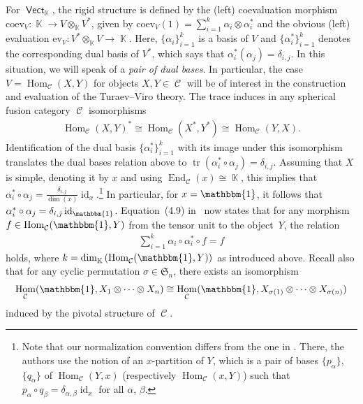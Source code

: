 \documentclass[10pt,a4paper]{amsart}
\DeclareMathOperator{\id}{id}
\DeclareMathOperator{\End}{End}
\DeclareMathOperator{\Hom}{Hom}
\DeclareMathOperator{\tr}{tr}
\DeclareMathOperator{\vect}{\mathsf{Vect}}
\DeclareMathOperator{\K}{\mathbb{K}}
\DeclareMathOperator{\calc}{\mathcal{C}}
\numberwithin{equation}{section}
\theoremstyle{definition}
\begin{document}
For $\vect_{\K}$, the rigid structure is defined by the (left) coevaluation morphism $\mathrm{coev}_{V}\colon \K \rightarrow V \otimes_{\K} V^*$, given by $\mathrm{coev}_V(1) = \sum_{i = 1}^k\alpha_i \otimes \alpha_i^*$ and the obvious (left) evaluation $\mathrm{ev}_V\colon V^* \otimes_{\K} V \rightarrow \K$. Here, $\{\alpha_i\}_{i = 1}^k$ is a basis of $V$ and $\{\alpha_i^*\}_{i = 1}^k$ denotes the corresponding dual basis of $V^*$, which says that $\alpha_i^*(\alpha_j) = \delta_{i,j}$. In this situation, we will speak of a \textit{pair of dual bases}. In particular, the case $V = \Hom_{\calc}(X, Y)$ for objects $X, Y \in \calc$ will be of interest in the construction and evaluation of the Turaev--Viro theory. The trace induces in any spherical fusion category $\calc$ isomorphisms
\begin{align}
 \label{eqDual}
 \Hom_{\calc}(X, Y)^* \cong \Hom_{\calc}(X^*, Y^*) \cong \Hom_{\calc}(Y, X).
\end{align}
Identification of the dual basis $\{\alpha_i^*\}_{i = 1}^k$ with its image under this isomorphism translates the dual bases relation above to $\tr(\alpha_i^* \circ \alpha_j) = \delta_{i,j}$. Assuming that $X$ is simple, denoting it by $x$ and using $\End_{\calc}(x) \cong \K$, this implies that $\alpha_i^* \circ \alpha_j = \frac{\delta_{i,j}}{\dim(x)}\id_x$.\footnote{Note that our normalization convention differs from the one in \cite[Section~4.4.1]{TV}. There, the authors use the notion of an $x$-partition of $Y$, which is a pair of bases $\{p_{\alpha}\}$, $\{q_{\alpha}\}$ of $\Hom_{\calc}(Y, x)$ (respectively $\Hom_{\calc}(x, Y)$) such that $p_{\alpha} \circ q_{\beta} = \delta_{\alpha, \beta}\id_x$ for all $\alpha$, $\beta$.} In particular, for $x = \mathbbm{1}$, it follows that $\alpha_i^* \circ \alpha_j = \delta_{i,j} \id_{\mathbbm{1}}$. Equation~(4.9) in~\cite{TV} now states that for any morphism $f \in \Hom_{\calc}(\mathbbm{1}, Y)$ from the tensor unit to the object~$Y$, the relation
\begin{align}
\label{eqTV49}
 \sum_{i = 1}^k \alpha_i \circ \alpha_i^* \circ f = f
\end{align}
holds, where $k = \dim_{\K}\left(\Hom_{\calc}(\mathbbm{1}, Y)\right)$ as introduced above. Recall also that for any cyclic permutation $\sigma \in \mathfrak{S}_n$, there exists an isomorphism
\begin{align}
 \label{eqCycl}
 \Hom_{\calc}(\mathbbm{1}, X_1 \otimes \dots \otimes X_n) \cong \Hom_{\calc}(\mathbbm{1}, X_{\sigma(1)} \otimes \dots \otimes X_{\sigma(n)})
\end{align}
induced by the pivotal structure of $\calc$.
\end{document}
